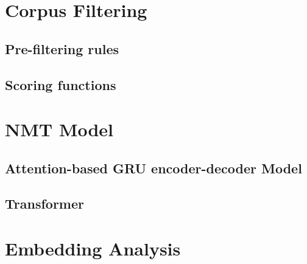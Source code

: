 \section{Corpus Filtering} \label{sec:corpus_filtering}



\subsection{Pre-filtering rules}


\subsection{Scoring functions}



\section{NMT Model} \label{sec:nmt_model}


\subsection{Attention-based GRU encoder-decoder Model} \label{sec:rnn}



\subsection{Transformer} \label{sec:transformer}



\section{Embedding Analysis} \label{sec:embedding_analysis}

